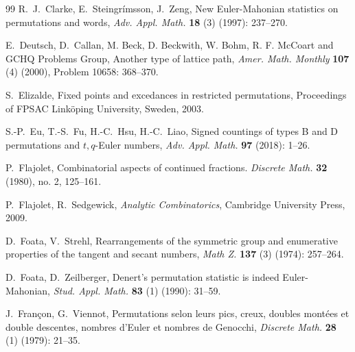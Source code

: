 \documentclass[12pt,reqno]{amsart}
\numberwithin{equation}{section}
\theoremstyle{plain}
\theoremstyle{definition}
\begin{document}
\begin{thebibliography}{99}
 R.~J.~Clarke, E.~Steingr\'{i}msson, J.~Zeng, New Euler-Mahonian statistics on permutations and words, \textit{Adv. Appl. Math.} {\bf 18} (3) (1997): 237--270.

 E.~Deutsch, D.~Callan, M. Beck, D. Beckwith, W. Bohm, R. F. McCoart and GCHQ Problems Group, Another type of lattice path, \textit{Amer. Math. Monthly} {\bf 107} (4) (2000), Problem 10658: 368--370.

 S.~Elizalde, Fixed points and excedances in restricted permutations, Proceedings of FPSAC Link\"oping University, Sweden, 2003.


 S.-P.~Eu, T.-S.~Fu, H.-C.~Hsu, H.-C.~Liao, Signed countings of types B and D permutations and $t,q$-Euler numbers, \textit{Adv. Appl. Math.} {\bf 97} (2018): 1--26.
%


 P.~Flajolet, Combinatorial aspects of continued fractions. \textit{Discrete Math.} {\bf 32} (1980), no. 2, 125--161.

 P.~Flajolet, R.~Sedgewick, \textit{Analytic Combinatorics}, Cambridge University Press, 2009.
%
%

 D.~Foata, V.~Strehl, Rearrangements of the symmetric group and enumerative properties of the tangent and secant numbers, \textit{Math Z.} {\bf137} (3) (1974): 257--264.

 D.~Foata, D.~Zeilberger, Denert's permutation statistic is indeed Euler-Mahonian, \textit{Stud. Appl. Math.} {\bf83} (1) (1990): 31--59.

 J.~Fran\c con, G.~Viennot, Permutations selon leurs pics, creux, doubles mont\'ees et double descentes, nombres d'Euler et nombres de Genocchi, \textit{Discrete Math.} {\bf28} (1) (1979): 21--35.


\end{thebibliography}
\end{document}
